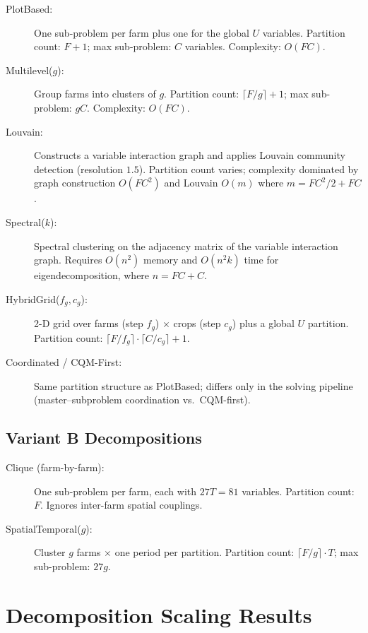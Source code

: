 \documentclass[11pt,a4paper]{article}
\begin{document}
\begin{description}
  \item[PlotBased:] One sub-problem per farm plus one for the global $U$ variables.
    Partition count: $F + 1$; max sub-problem: $C$ variables. Complexity: $O(FC)$.
  \item[Multilevel($g$):] Group farms into clusters of $g$. Partition count:
    $\lceil F/g\rceil + 1$; max sub-problem: $gC$. Complexity: $O(FC)$.
  \item[Louvain:] Constructs a variable interaction graph and applies Louvain
    community detection (resolution $1.5$). Partition count varies; complexity
    dominated by graph construction $O(F C^2)$ and Louvain $O(m)$ where $m = FC^2/2 + FC$.
  \item[Spectral($k$):] Spectral clustering on the adjacency matrix of the
    variable interaction graph.  Requires $O(n^2)$ memory and $O(n^2 k)$ time
    for eigendecomposition, where $n = FC + C$.
  \item[HybridGrid($f_g, c_g$):] 2-D grid over farms (step $f_g$) $\times$ crops
    (step $c_g$) plus a global $U$ partition. Partition count:
    $\lceil F/f_g\rceil \cdot \lceil C/c_g\rceil + 1$.
  \item[Coordinated / CQM-First:] Same partition structure as PlotBased; differs only
    in the solving pipeline (master--subproblem coordination vs.\ CQM-first).
\end{description}

\subsection{Variant B Decompositions}

\begin{description}
  \item[Clique (farm-by-farm):] One sub-problem per farm, each with $27T = 81$
    variables. Partition count: $F$. Ignores inter-farm spatial couplings.
  \item[SpatialTemporal($g$):] Cluster $g$ farms $\times$ one period per partition.
    Partition count: $\lceil F/g\rceil \cdot T$; max sub-problem: $27g$.
\end{description}

\section{Decomposition Scaling Results}
\label{sec:scaling}
\end{document}
